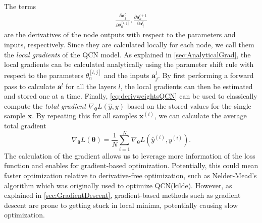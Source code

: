 The terms 
\begin{equation}\label{eq:localGradients}
\begin{aligned}
    \frac{\partial \boldsymbol{a}^{l}_j}{\partial \theta^{[l,j]}_n}, \frac{\partial \boldsymbol{a}^{l+1}_k}{\partial \boldsymbol{a}^{l}_j}
\end{aligned}
\end{equation} are the derivatives of the node outputs with respect to the parameters and inputs, respectively. Since they are calculated locally for each node, we call them the \emph{local gradients} of the QCN model. As explained in \autoref{sec:AnalyticalGrad}, the local gradients can be calculated analytically using the parameter shift rule with respect to the parameters $\theta^{[l,j]}_n$ and the inputs $\boldsymbol{a}^{l}_j$. By first performing a forward pass to calculate $\boldsymbol{a}^{l}$ for all the layers $l$, the local gradients can then be estimated and stored one at a time. Finally, \autoref{eq:derivweightsQCN} can be used to classically compute the \emph{total gradient} $\nabla_{\boldsymbol{\theta}} L(\hat{y},y)$ based on the stored values for the single sample $\boldsymbol{x}$. By repeating this for all samples $\boldsymbol{x}^{(i)}$, we can calculate the average total gradient \begin{equation}\label{eq:averageGradientQCN}
    \nabla_{\boldsymbol{\theta}} L(\boldsymbol{\theta}) = \frac{1}{N}\sum_{i=1}^N \nabla_{\boldsymbol{\theta}} L(\hat{y}^{(i)}, y^{(i)}).
\end{equation}  The calculation of the gradient allows us to leverage more information of the loss function and enables for gradient-based optimization. Potentially, this could mean faster optimization relative to derivative-free optimization, such as Nelder-Mead's algorithm which was originally used to optimize QCN(kilde). However, as explained in \autoref{sec:GradientDescent}, gradient-based methods such as gradient descent are prone to getting stuck in local minima, potentially causing slow optimization.    


